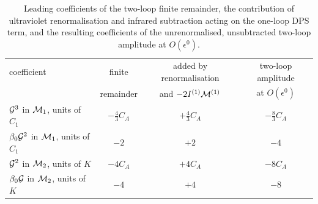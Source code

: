 \begin{table}[!htb]
\centering
\small
\begin{tabular}{lccc}
\toprule
coefficient & finite & added by renormalisation & two-loop amplitude\\
& remainder & and $-2I^{(1)}\mathcal M^{(1)}$ & at $O(\epsilon^0)$\\
\midrule
$\mathcal G^3$ in $\mathcal M_1$, units of $C_1$ & $-\frac43C_A$ & $+\frac43C_A$ & $-\frac83C_A$\\
$\beta_0\mathcal G^2$ in $\mathcal M_1$, units of $C_1$ & $-2$ & $+2$ & $-4$\\
$\mathcal G^2$ in $\mathcal M_2$, units of $K$ & $-4C_A$ & $+4C_A$ & $-8C_A$\\
$\beta_0\mathcal G$ in $\mathcal M_2$, units of $K$ & $-4$ & $+4$ & $-8$\\
\bottomrule
\end{tabular}
\caption{Leading coefficients of the two-loop finite remainder, the contribution of ultraviolet renormalisation and infrared subtraction acting on the one-loop DPS term, and the resulting coefficients of the unrenormalised, unsubtracted two-loop amplitude at $O(\epsilon^0)$.}
\label{tab:stage2a}
\end{table}
